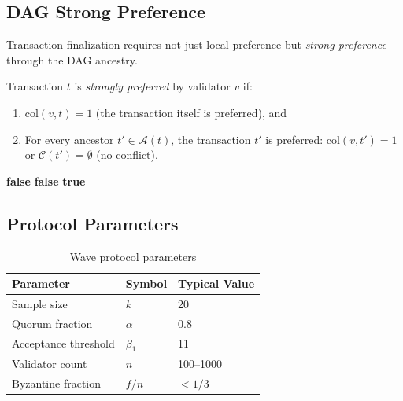 \subsection{DAG Strong Preference}

Transaction finalization requires not just local preference but \emph{strong preference}
through the DAG ancestry.

\begin{definition}
\label{def:wave-strong-pref}
Transaction $t$ is \emph{strongly preferred} by validator $v$ if:
\begin{enumerate}[nosep]
\item $\text{col}(v, t) = 1$ (the transaction itself is preferred), and
\item For every ancestor $t' \in \mathcal{A}(t)$, the transaction $t'$ is preferred:
$\text{col}(v, t') = 1$ or $\mathcal{C}(t') = \emptyset$ (no conflict).
\end{enumerate}
\end{definition}

\begin{algorithm}[H]
\caption{Wave DAG Strong Preference Check}
\label{alg:wave-wave-dag}
\begin{algorithmic}[1]
        \Return \textbf{false}
    \EndIf
     
            \Return \textbf{false} 
        \EndIf
    \EndFor
    \Return \textbf{true}
\EndFunction
\end{algorithmic}
\end{algorithm}

\subsection{Protocol Parameters}

\begin{table}[h]
\centering
\begin{tabular}{@{}lll@{}}
\toprule
\textbf{Parameter} & \textbf{Symbol} & \textbf{Typical Value} \\
\midrule
Sample size & $k$ & 20 \\
Quorum fraction & $\alpha$ & 0.8 \\
Acceptance threshold & $\beta_1$ & 11 \\
Validator count & $n$ & 100--1000 \\
Byzantine fraction & $f/n$ & $< 1/3$ \\
\bottomrule
\end{tabular}
\caption{Wave protocol parameters}
\label{tab:wave-params}
\end{table}

